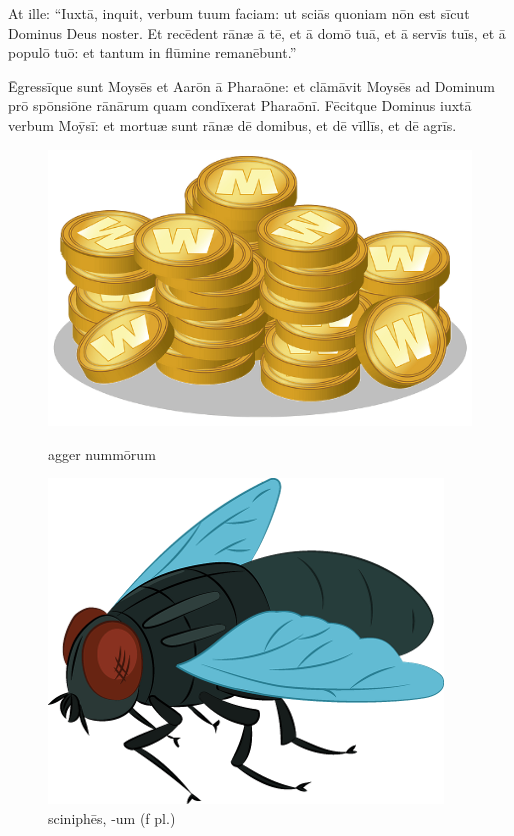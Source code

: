 At ille: ``Iuxtā, inquit, verbum tuum faciam: ut sciās
quoniam nōn est sīcut Dominus Deus noster.  Et recēdent
rānæ ā tē, et ā domō tuā, et ā servīs tuīs, et ā populō tuō:
et tantum in flūmine remanēbunt.''

Ēgressīque sunt
Moysēs et Aarōn ā Pharaōne: et clāmāvit
Moysēs ad Dominum prō spōnsiōne
rānārum quam condīxerat
Pharaōnī.  Fēcitque Dominus iuxtā verbum Moȳsī: et
mortuæ sunt rānæ dē domibus, et dē vīllīs, et dē agrīs.

\begin{figure}[h]
    \begin{minipage}[h!]{0.5\linewidth}
        \centering
        \includegraphics{agger.png}
        \caption{agger nummōrum}
    \end{minipage}%
    \begin{minipage}[h!]{0.5\linewidth}
        \centering
        \includegraphics{fly}
        \caption{sciniphēs, -um (f pl.)}
    \end{minipage}
\end{figure}

